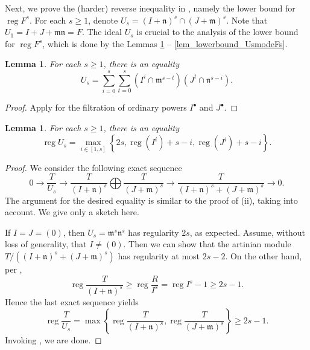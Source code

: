 \documentclass{amsart}
\DeclareMathOperator{\reg}{reg}
\newcommand{\mm}{\mathfrak{m}}
\newcommand{\nn}{\mathfrak{n}}
\theoremstyle{plain}
\newtheorem{lem}[thm]{Lemma}
\theoremstyle{definition}
\numberwithin{equation}{section}
\begin{document}
Next, we prove the (harder) reverse inequality in , namely the lower bound for $\reg F^s$. For each $s\ge 1$, denote $U_s=(I+\nn)^s\cap (J+\mm)^s$. Note that $U_1=I+J+\mm \nn=F$. The ideal $U_s$ is crucial to the analysis of the lower bound for $\reg F^s$, which is done by the Lemmas \ref{lem_decomposition_G} -- \ref{lem_lowerbound_UsmodeFs}.

\begin{lem}
\label{lem_decomposition_G}
 For each $s\ge 1$, there is an equality
\[
U_s= \sum_{i=0}^s\sum_{t=0}^s (I^i\cap \mm^{s-t})(J^t\cap \nn^{s-i}).
\]
\end{lem}
\begin{proof}
Apply  for the filtration of ordinary powers $I^\bullet$ and $J^\bullet$. 
\end{proof}

\begin{lem}
\label{lem_regUs}
For each $s\ge 1$, there is an equality
\[
\reg U_s = \max \limits_{i\in [1,s]} \left\{2s,\reg(I^i)+s-i, \reg(J^i)+s-i\right\}.
\]
\end{lem}
\begin{proof}
We consider the following exact sequence
\[
0\to \frac{T}{U_s} \to \frac{T}{(I+\nn)^s}\bigoplus  \frac{T}{(J+\mm)^s} \to \frac{T}{(I+\nn)^s+(J+\mm)^s}\to 0.
\]
The argument for the desired equality  is similar to the proof of (ii), taking  into account. We give only a sketch here.

If $I=J=(0)$, then $U_s=\mm^s\nn^s$ has regularity $2s$, as expected. Assume, without loss of generality, that $I\neq (0)$. Then we can show that the artinian module $T/\left((I+\nn)^s+(J+\mm)^s\right)$ has regularity at most $2s-2$. On the other hand, per ,
\[
\reg \frac{T}{(I+\nn)^s} \ge \reg \frac{R}{I^s}=\reg I^s-1 \ge 2s-1.
\]
Hence the last exact sequence yields
\[
\reg \frac{T}{U_s} =\max \left\{\reg \frac{T}{(I+\nn)^s},\reg \frac{T}{(J+\mm)^s}\right\} \ge 2s-1.
\]
Invoking , we are done.
\end{proof}
\end{document}
